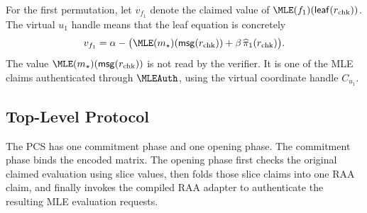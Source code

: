 For the first permutation, let \(v_{f_1}\) denote the claimed value of
\(\MLE(f_1)(\mathsf{leaf}(r_{\mathrm{chk}}))\).  The virtual \(u_1\) handle
means that the leaf equation is concretely
\[
  v_{f_1}
  =
  \alpha-\bigl(\MLE(m_\star)(\mathsf{msg}(r_{\mathrm{chk}}))
  +\beta\,\widehat\pi_1(r_{\mathrm{chk}})\bigr).
\]
The value \(\MLE(m_\star)(\mathsf{msg}(r_{\mathrm{chk}}))\) is not read by the
verifier.  It is one of the MLE claims authenticated through
\(\MLEAuth\), using the virtual coordinate handle \(C_{u_1}\).

\subsection{Top-Level Protocol}

The PCS has one commitment phase and one opening phase.  The commitment phase
binds the encoded matrix.  The opening phase first checks the original claimed
evaluation using slice values, then folds those slice claims into one RAA claim,
and finally invokes the compiled RAA adapter to authenticate the resulting MLE
evaluation requests.

